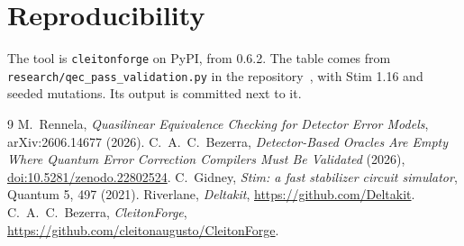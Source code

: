 \documentclass[10pt]{article}
\begin{document}
\section{Reproducibility}

The tool is \texttt{cleitonforge} on PyPI, from 0.6.2. The table comes from
\texttt{research/qec\_pass\_validation.py} in the repository~\cite{cleitonforge},
with Stim 1.16 and seeded mutations. Its output is committed next to it.

\begin{thebibliography}{9}
 M.~Rennela, \emph{Quasilinear Equivalence Checking for
Detector Error Models}, arXiv:2606.14677 (2026).
 C.~A.~C.~Bezerra, \emph{Detector-Based Oracles Are Empty
Where Quantum Error Correction Compilers Must Be Validated} (2026),
\href{https://doi.org/10.5281/zenodo.22802524}{doi:10.5281/zenodo.22802524}.
 C.~Gidney, \emph{Stim: a fast stabilizer circuit
simulator}, Quantum 5, 497 (2021).
 Riverlane, \emph{Deltakit},
\url{https://github.com/Deltakit}.
 C.~A.~C.~Bezerra, \emph{CleitonForge},
\url{https://github.com/cleitonaugusto/CleitonForge}.
\end{thebibliography}
\end{document}
